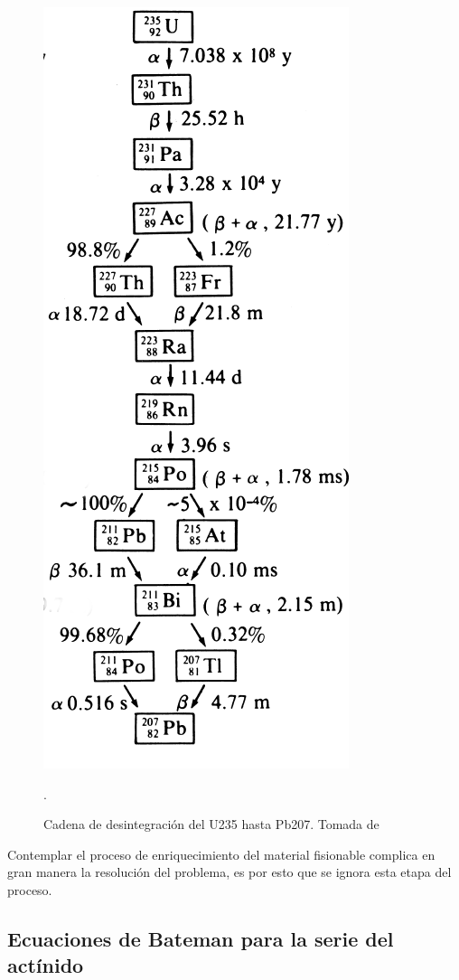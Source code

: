 \begin{figure}[H]
    \centering
    \includegraphics[scale=0.425]{imagenes/cadenaluz.png}
    \caption{Cadena de desintegración del U235 hasta Pb207. Tomada de \cite{HUBENER2003211}}.
    \label{cadenadelu235}
\end{figure}

Contemplar el proceso de enriquecimiento del material fisionable complica en gran manera la resolución del problema, es por esto que se ignora esta etapa del proceso.  

\subsection{Ecuaciones de Bateman para la serie del actínido}

